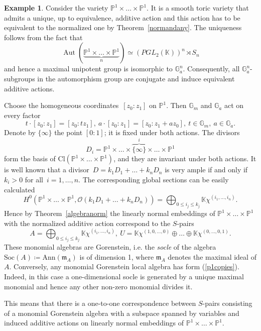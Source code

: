 \documentclass[a4paper,draft,reqno,12pt]{amsart}
\theoremstyle{definition}
\theoremstyle{definition}
\newtheorem{example}{Example}
\theoremstyle{remark}
\DeclareMathOperator{\Aut}{Aut}
\def\BG{{\mathbb G}}
\def\BK{{\mathbb K}}
\def\BG{{\mathbb G}}
\def\BK{{\mathbb K}}
\def\BP{{\mathbb P}}
\def\CO{\mathcal{O}}
\def\Soc{\mathrm{Soc}}
\def\Cl{\mathrm{Cl}}
\def\mf{\mathfrak{m}}
\def\Ann{\mathrm{Ann}}
\begin{document}
\begin{example}\label{example1}
    Consider the variety $\BP^1\times\dotsc\times\BP^1$. It is a smooth toric variety that admits a unique, up to equivalence, additive action and this action has to be equivalent to the normalized one by Theorem~\ref{normandany}. The uniqueness follows from the fact that\begin{equation*}
        \Aut(\underbrace{\BP^1\times\dotsc\times\BP^1}_n) \simeq (PGL_2(\BK))^n\rtimes S_n
    \end{equation*} and hence a maximal unipotent group is isomorphic to $\BG_a^n$. Consequently, all $\BG_a^n$-subgroups in the automorphism group are conjugate and induce equivalent additive actions.
    
    Choose the homogeneous coordinates~$[z_0:z_1]$ on $\BP^1$. Then $\BG_m$ and $\BG_a$ act on every factor \begin{equation*}
        t\cdot[z_0:z_1] = [z_0:tz_1], \ a\cdot[z_0:z_1] = [z_0:z_1+az_0], \ t\in\BG_m, \ a\in\BG_a.
    \end{equation*} Denote by $\{\infty\}$ the point $[0:1]$; it is fixed under both actions. The divisors \begin{equation*}
        D_i = \BP^1\times\dotsc\times\overbrace{\{\infty\}}^{i}\times\dotsc\times\BP^1
    \end{equation*} form the basis of $\Cl(\BP^1\times\dotsc\times\BP^1)$, and they are invariant under both actions. It is well known that a divisor~$D=k_1D_1+\dotsc+k_nD_n$ is very ample if and only if~$k_i>0$ for all~$i=1,\dotsc,n$. The corresponding global sections can be easily calculated \begin{equation*}
        H^0(\BP^1\times\dotsc\times\BP^1,\CO(k_1D_1+\dotsc+k_nD_n)) = \bigoplus_{0\leq i_j\leq k_j}\BK\chi^{(i_1,\dotsc,i_n)}.
    \end{equation*} Hence by Theorem~\ref{algebranorm} the linearly normal embeddings of $\BP^1\times\dotsc\times\BP^1$ with the normalized additive action correspond to the $S$-pairs \begin{equation}\label{p1copies}
        A = \bigoplus_{0\leq i_j\leq k_j}\BK\chi^{(i_1,\dotsc,i_n)}, \ U = \BK\chi^{(1,0,\dotsc,0)}\oplus\dotsc\oplus\BK\chi^{(0,\dotsc,0,1)}.
    \end{equation} These monomial algebras are Gorenstein, i.e. the \emph{socle} of the algebra $\Soc (A) \coloneq \Ann(\mf_A)$ is of dimension 1, where $\mf_A$ denotes the maximal ideal of $A$. Conversely, any monomial Gorenstein local algebra has form (\ref{p1copies}). Indeed, in this case a one-dimensional socle is generated by a unique maximal monomial and hence any other non-zero monomial divides it. 
    
    This means that there is a one-to-one correspondence between $S$-pairs consisting of a monomial Gorenstein algebra with a subspace spanned by variables and induced additive actions on linearly normal embeddings of $\BP^1\times\dotsc\times\BP^1$.
\end{example}
\end{document}
